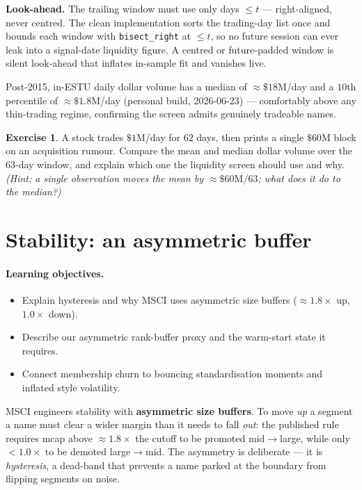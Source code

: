 \documentclass[11pt]{article}
\theoremstyle{definition}
\newtheorem{exercise}{Exercise}[section]
\theoremstyle{plain}
\theoremstyle{remark}
\begin{document}
\begin{pitfall}
\textbf{Look-ahead.} The trailing window must use only days $\le t$ --- right-aligned, never centred. The clean implementation sorts the trading-day list once and bounds each window with \texttt{bisect\_right} at $\le t$, so no future session can ever leak into a signal-date liquidity figure. A centred or future-padded window is silent look-ahead that inflates in-sample fit and vanishes live.
\end{pitfall}

\begin{observed}
Post-2015, in-ESTU daily dollar volume has a median of $\approx\$18$M/day and a $10$th percentile of $\approx\$1.8$M/day (personal build, 2026-06-23) --- comfortably above any thin-trading regime, confirming the screen admits genuinely tradeable names.
\end{observed}

\begin{exercise}
A stock trades $\$1$M/day for $62$ days, then prints a single $\$60$M block on an acquisition rumour. Compare the mean and median dollar volume over the $63$-day window, and explain which one the liquidity screen should use and why. \emph{(Hint: a single observation moves the mean by $\approx \$60\text{M}/63$; what does it do to the median?)}
\end{exercise}

\section{Stability: an asymmetric buffer}\label{sec:stab}

\paragraph{Learning objectives.}
\begin{itemize}[nosep,leftmargin=1.4em]
  \item Explain hysteresis and why MSCI uses asymmetric size buffers ($\approx 1.8\times$ up, $1.0\times$ down).
  \item Describe our asymmetric rank-buffer proxy and the warm-start state it requires.
  \item Connect membership churn to bouncing standardisation moments and inflated style volatility.
\end{itemize}

MSCI engineers stability with \textbf{asymmetric size buffers}. To move \emph{up} a segment a name must clear a wider margin than it needs to fall \emph{out}: the published rule requires mcap above $\approx 1.8\times$ the cutoff to be promoted mid$\to$large, while only $< 1.0\times$ to be demoted large$\to$mid. The asymmetry is deliberate --- it is \emph{hysteresis}, a dead-band that prevents a name parked at the boundary from flipping segments on noise.
\end{document}
